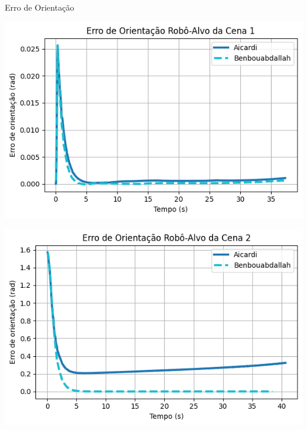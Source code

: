 \documentclass{beamer}
\begin{document}
\begin{frame}{Erro de Orientação}
\begin{minipage}{0.48\linewidth}
    \centering
    \includegraphics[width=\linewidth]{Figuras/ErroOrientação_Cena_1.png}
  \end{minipage}
  \hfill
  \begin{minipage}{0.48\linewidth}
    \centering
    \includegraphics[width=\linewidth]{Figuras/ErroOrientação_Cena_2.png}
  \end{minipage}
\end{frame}
\end{document}
